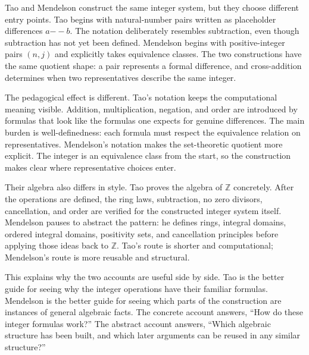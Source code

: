
\begin{remark*}[Exposition]
Tao and Mendelson construct the same integer system, but they choose different
entry points. Tao begins with natural-number pairs written as placeholder
differences \(a {-\!\!-} b\). The notation deliberately resembles
subtraction, even though subtraction has not yet been defined. Mendelson begins
with positive-integer pairs \((n,j)\) and explicitly takes equivalence classes.
The two constructions have the same quotient shape: a pair represents a formal
difference, and cross-addition determines when two representatives describe the
same integer.
\end{remark*}

\begin{remark*}[Exposition]
The pedagogical effect is different. Tao's notation keeps the computational
meaning visible. Addition, multiplication, negation, and order are introduced
by formulas that look like the formulas one expects for genuine differences.
The main burden is well-definedness: each formula must respect the equivalence
relation on representatives. Mendelson's notation makes the set-theoretic
quotient more explicit. The integer is an equivalence class from the start, so
the construction makes clear where representative choices enter.
\end{remark*}

\begin{remark*}[Exposition]
Their algebra also differs in style. Tao proves the algebra of
\(\mathbb{Z}\) concretely. After the operations are defined, the ring laws,
subtraction, no zero divisors, cancellation, and order are verified for the
constructed integer system itself. Mendelson pauses to abstract the pattern:
he defines rings, integral domains, ordered integral domains, positivity sets,
and cancellation principles before applying those ideas back to
\(\mathbb{Z}\). Tao's route is shorter and computational; Mendelson's route is
more reusable and structural.
\end{remark*}

\begin{remark*}[Exposition]
This explains why the two accounts are useful side by side. Tao is the better
guide for seeing why the integer operations have their familiar formulas.
Mendelson is the better guide for seeing which parts of the construction are
instances of general algebraic facts. The concrete account answers, ``How do
these integer formulas work?'' The abstract account answers, ``Which algebraic
structure has been built, and which later arguments can be reused in any
similar structure?''
\end{remark*}
